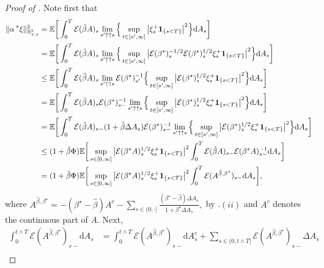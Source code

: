 \documentclass[10pt]{article} %
\newcommand\cE{\mathcal E}
\newcommand{\smalltext}[1]{\text{\fontsize{4}{4}\selectfont$#1$}}
\def \E{\mathbb{E}}
\def \H{\mathbb{H}}
\newcommand{\brs}[1]{\prescript{\ast}{}{#1}}
\def\d{\mathrm{d}}
\begin{document}
\begin{proof}[Proof of ]
	Note first that
	\begin{align*}
		\|\alpha \brs{\xi}\|_{\H^\smalltext{2}_{\smalltext{T}\smalltext{,}\smalltext{\hat\beta}}}^2 
		&= \E\bigg[\int_0^T\cE(\hat\beta A)_s \lim_{s^\prime \uparrow\uparrow s} \Big\{\sup_{t \in [s^\prime,\infty]}\big|\xi^+_s\mathbf{1}_{\{s < T\}}\big|^2\Big\} \d A_s \bigg] \\
		&= \E\bigg[\int_0^T\cE(\hat\beta A)_s \lim_{s^\prime \uparrow\uparrow s} \Big\{\sup_{t \in [s^\prime,\infty]}\big|\cE(\beta^\star)^{-1/2}_s\cE(\beta^\star)^{1/2}_s\xi^+_s\mathbf{1}_{\{s < T\}}\big|^2\Big\} \d A_s \bigg] \\
		&\leq \E\bigg[\int_0^T\cE(\hat\beta A)_s \lim_{s^\prime \uparrow\uparrow s} \cE(\beta^\star)^{-1}_{s^\prime}\Big\{\sup_{t \in [s^\prime,\infty]}\big|\cE(\beta^\star)^{1/2}_s\xi^+_s\mathbf{1}_{\{s < T\}}\big|^2\Big\} \d A_s \bigg] \\
		&= \E\bigg[\int_0^T\cE(\hat\beta A)_s \cE(\beta^\star)^{-1}_{s-} \lim_{s^\prime \uparrow\uparrow s} \Big\{\sup_{t \in [s^\prime,\infty]}\big|\cE(\beta^\star)^{1/2}_s\xi^+_s\mathbf{1}_{\{s < T\}}\big|^2\Big\} \d A_s \bigg] \\
		&= \E\bigg[\int_0^T\cE(\hat\beta A)_{s-}(1+\hat\beta\Delta A_s) \cE(\beta^\star)^{-1}_{s-} \lim_{s^\prime \uparrow\uparrow s} \Big\{\sup_{t \in [s^\prime,\infty]}\big|\cE(\beta^\star)^{1/2}_s\xi^+_s\mathbf{1}_{\{s < T\}}\big|^2\Big\} \d A_s \bigg] \\
		&\leq (1+\hat\beta \Phi)\E\bigg[\sup_{s \in [0,\infty]}\big|\cE(\beta^\star A)^{1/2}_s\xi^+_s\mathbf{1}_{\{s < T\}}\big|^2 \int_0^T\cE(\hat\beta A)_{s-}\cE(\beta^\star A)^{-1}_{s-}\d A_s\bigg] \\
		&= (1+\hat\beta \Phi)\E\bigg[\sup_{s \in [0,\infty]}\big|\cE(\beta^\star A)^{1/2}_s\xi^+_s\mathbf{1}_{\{s < T\}}\big|^2 \int_0^T\cE(A^{\hat\beta,\beta^\star})_{s-}\d A_s\bigg],
	\end{align*}
	where $A^{\hat\beta,\beta^\star} = -(\beta^\star - \hat\beta)A^c - \sum_{s \in (0,\cdot]} \frac{(\beta^\star- \hat\beta)\Delta A_s}{1+\beta^\star \Delta A_s},$ by .$(ii)$ and $A^c$ denotes the continuous part of $A$. Next,
	\begin{align*}
		\int_0^{t \land T}\cE(A^{\hat\beta,\beta^\star})_{s-}\d A_s 
		&= \int_0^{t \land T}\cE(A^{\hat\beta,\beta^\star})_{s-}\d A^c_s + \sum_{s \in (0,t \land T]}\cE(A^{\hat\beta,\beta^\star})_{s-}\Delta A_s \\

\end{align*}
\end{proof}
\end{document}
